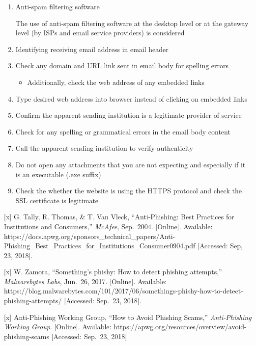 \documentclass[11pt]{article}
\providecommand{\tightlist}{%
      \setlength{\itemsep}{0pt}\setlength{\parskip}{0pt}}
\begin{document}
\begin{enumerate}
\def\labelenumi{\arabic{enumi}.}
\item
  Anti-spam filtering software

  The use of anti-spam filtering software at the desktop level or at the
  gateway level (by ISPs and email service providers) is considered
\item
  Identifying receiving email address in email header
\item
  Check any domain and URL link sent in email body for spelling errors

  \begin{itemize}
  \tightlist
  \item
    Additionally, check the web address of any embedded links
  \end{itemize}
\item
  Type desired web address into browser instead of clicking on embedded
  links
\item
  Confirm the apparent sending institution is a legitimate provider of
  service
\item
  Check for any spelling or grammatical errors in the email body
  content\\
\item
  Call the apparent sending institution to verify authenticity\\
\item
  Do not open any attachments that you are not expecting and especially
  if it is an executable (.exe suffix)
\item
  Check the whether the website is using the HTTPS protocol and check
  the SSL certificate is legitimate
\end{enumerate}

{[}x{]} G. Tally, R. Thomas, \& T. Van Vleck, ``Anti-Phishing: Best
Practices for Institutions and Consumers,'' \emph{McAfee}, Sep.~2004.
{[}Online{]}. Available:
https://docs.apwg.org/sponsors\_technical\_papers/Anti-Phishing\_Best\_Practices\_for\_Institutions\_Consumer0904.pdf
{[}Accessed: Sep, 23, 2018{]}.

{[}x{]} W. Zamora, ``Something's phishy: How to detect phishing
attempts,'' \emph{Malwarebytes Labs}, Jun.~26, 2017. {[}Online{]}.
Available:
https://blog.malwarebytes.com/101/2017/06/somethings-phishy-how-to-detect-phishing-attempts/
{[}Accessed: Sep.~23, 2018{]}.

{[}x{]} Anti-Phishing Working Group, ``How to Avoid Phishing Scams,''
\emph{Anti-Phishing Working Group}. {[}Online{]}. Available:
https://apwg.org/resources/overview/avoid-phishing-scams {[}Accessed:
Sep.~23, 2018{]}
\end{document}
